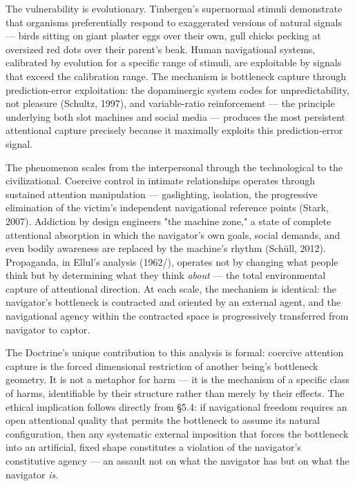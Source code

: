 The vulnerability is evolutionary. Tinbergen's supernormal stimuli demonstrate that organisms preferentially respond to exaggerated versions of natural signals — birds sitting on giant plaster eggs over their own, gull chicks pecking at oversized red dots over their parent's beak. Human navigational systems, calibrated by evolution for a specific range of stimuli, are exploitable by signals that exceed the calibration range. The mechanism is bottleneck capture through prediction-error exploitation: the dopaminergic system codes for unpredictability, not pleasure (Schultz, 1997), and variable-ratio reinforcement — the principle underlying both slot machines and social media — produces the most persistent attentional capture precisely because it maximally exploits this prediction-error signal.


The phenomenon scales from the interpersonal through the technological to the civilizational. Coercive control in intimate relationships operates through sustained attention manipulation — gaslighting, isolation, the progressive elimination of the victim's independent navigational reference points (Stark, 2007). Addiction by design engineers "the machine zone," a state of complete attentional absorption in which the navigator's own goals, social demands, and even bodily awareness are replaced by the machine's rhythm (Schüll, 2012). Propaganda, in Ellul's analysis (1962/), operates not by changing what people think but by determining what they think \textit{about} — the total environmental capture of attentional direction. At each scale, the mechanism is identical: the navigator's bottleneck is contracted and oriented by an external agent, and the navigational agency within the contracted space is progressively transferred from navigator to captor.


The Doctrine's unique contribution to this analysis is formal: coercive attention capture is the forced dimensional restriction of another being's bottleneck geometry. It is not a metaphor for harm — it is the mechanism of a specific class of harms, identifiable by their structure rather than merely by their effects. The ethical implication follows directly from §5.4: if navigational freedom requires an open attentional quality that permits the bottleneck to assume its natural configuration, then any systematic external imposition that forces the bottleneck into an artificial, fixed shape constitutes a violation of the navigator's constitutive agency — an assault not on what the navigator has but on what the navigator \textit{is}.


